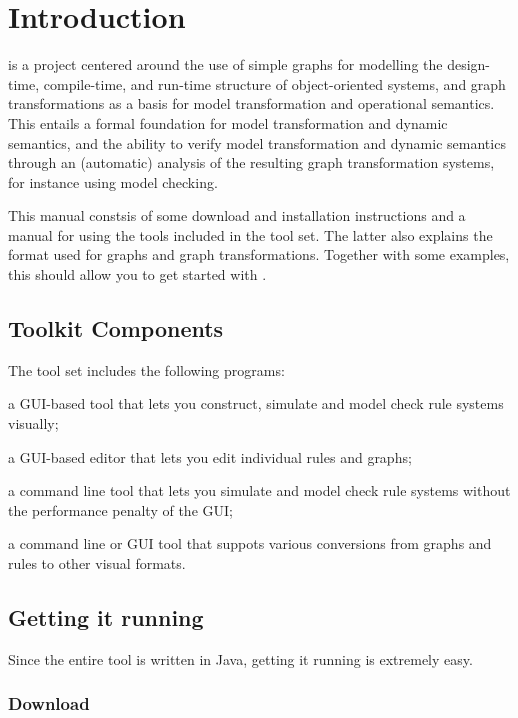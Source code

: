 \section{Introduction}

\GROOVE is a project centered around the use of simple graphs for
modelling the design-time, compile-time, and run-time structure of
object-oriented systems, and graph transformations as a basis for
model transformation and operational semantics. This entails a formal
foundation for  model transformation and dynamic semantics, and the
ability to verify model transformation and dynamic semantics through
an (automatic) analysis of the resulting graph transformation systems,
for instance using model checking.

This manual constsis of some download and installation instructions and a
manual for using the tools included in the \GROOVE tool set. The latter also
explains the format used for graphs and graph transformations. Together
with some examples, this should allow you to get started with \GROOVE.

\subsection{Toolkit Components}

The \GROOVE tool set includes the following programs:
\begin{description}\noitemsep
\item[Simulator:] a GUI-based tool that lets you construct, simulate and
  model check rule systems visually;
\item[Editor:] a GUI-based editor that lets you edit individual rules and
  graphs;
\item[Generator:] a command line tool that lets you simulate and model check
  rule systems without the performance penalty of the GUI;
\item[Imager:] a command line or GUI tool that suppots various conversions from
  \GROOVE graphs and rules to other visual formats.
\end{description}

\subsection{Getting it running}

Since the entire \GROOVE tool is written in Java, getting it running is
extremely easy.

\subsubsection{Download}

